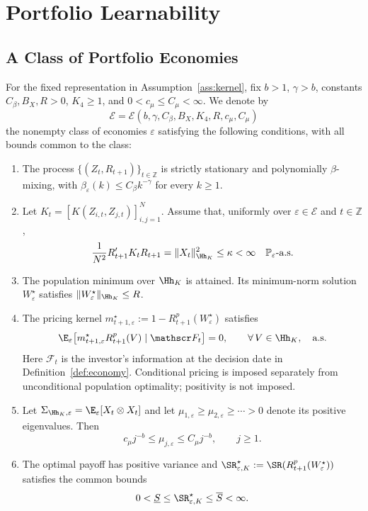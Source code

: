 \section{Portfolio Learnability}
\label{sec:portfolio_learnability}

\subsection{A Class of Portfolio Economies}
\label{sec:economy_class}

For the fixed representation in Assumption~\ref{ass:kernel}, fix $b>1$,
$\gamma>b$, constants $C_\beta,B_X,R>0$, $K_4\geq1$, and
$0<c_\mu\leq C_\mu<\infty$.
We denote by
\[
\mathcal E
=
\mathcal E(b,\gamma,C_\beta,B_X,K_4,R,c_\mu,C_\mu)
\]
the nonempty class of economies $\varepsilon$ satisfying the following
conditions, with all bounds common to the class:

\begin{enumerate}[label=\textup{(E\arabic*)},leftmargin=*,itemsep=0.4em]

\item\label{ec:dependence}
The process $\{(Z_t,R_{t+1})\}_{t\in\mathbb Z}$ is strictly stationary and
polynomially $\beta$-mixing, with
$\beta_\varepsilon(k)\leq C_\beta k^{-\gamma}$ for every $k\geq1$.

\item\label{ec:returns}
Let $K_t=[K(Z_{i,t},Z_{j,t})]_{i,j=1}^N$.
Assume that, uniformly over $\varepsilon\in\mathcal E$ and $t\in\mathbb Z$,
\[
\frac{1}{N^2}R_{t+1}'K_tR_{t+1}
=\|X_t\|_{\Hh_K}^2
\leq\kappa<\infty
\quad\mathbb P_\varepsilon\text{-a.s.}
\]


\item\label{ec:target}
The population minimum over $\Hh_K$ is attained. Its minimum-norm solution
$W^\star_\varepsilon$ satisfies $\|W^\star_\varepsilon\|_{\Hh_K}\leq R$.

\item\label{ec:pricing}
The pricing kernel $m^\star_{t+1,\varepsilon}
:=1-R^p_{t+1}(W^\star_\varepsilon)$ satisfies
\[
\E_\varepsilon\!\left[
 m^\star_{t+1,\varepsilon}R^p_{t+1}(V)
 \mid\mathscr F_t
\right]=0,
\qquad \forall\,V\in\Hh_K,
\quad\text{a.s.}
\]
Here $\mathscr F_t$ is the investor's information at the decision date in
Definition~\ref{def:economy}. Conditional pricing is imposed separately from
unconditional population optimality; positivity is not imposed.

\item\label{ec:spectrum}
Let $\Sigma_{\Hh_K,\varepsilon}=\E_\varepsilon[X_t\otimes X_t]$ and let
$\mu_{1,\varepsilon}\geq\mu_{2,\varepsilon}\geq\cdots>0$ denote its positive
eigenvalues. Then
\[
c_\mu j^{-b}\leq\mu_{j,\varepsilon}\leq C_\mu j^{-b},
\qquad j\geq1.
\]

\item\label{ec:sharpe}
The optimal payoff has positive
variance and $\SR^\star_{\varepsilon,K}:=\SR(R^p_{t+1}(W^\star_\varepsilon))$
satisfies the common bounds
\[
0<\underline S\leq\SR^\star_{\varepsilon,K}\leq\overline S<\infty.
\]
\end{enumerate}

